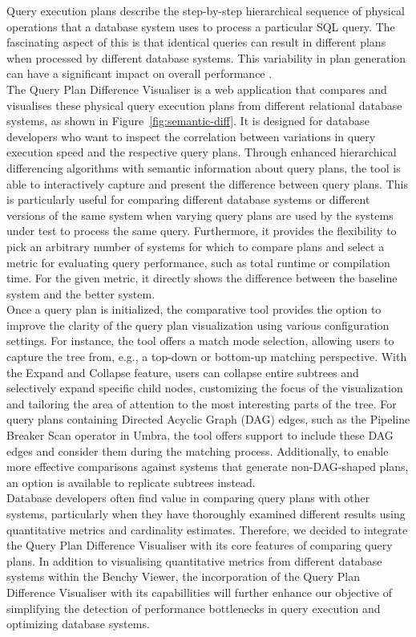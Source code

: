 Query execution plans describe the step-by-step hierarchical sequence of physical operations that a database system uses to process a particular SQL query. The fascinating aspect of this is that identical queries can result in different plans when processed by different database systems. This variability in plan generation can have a significant impact on overall performance \parencite*{GroupjoinAndNestedAggregates}.
\\The Query Plan Difference Visualiser is a web application that compares and visualises these physical query execution plans from different relational database systems, as shown in Figure~\ref{fig:semantic-diff}. It is designed for database developers who want to inspect the correlation between variations in query execution speed and the respective query plans. Through enhanced hierarchical differencing algorithms with semantic information about query plans, the tool is able to interactively capture and present  the difference between query plans. This is particularly useful for comparing different database systems or different versions of the same system when varying query plans are used by the systems under test to process the same query. Furthermore, it provides the flexibility to pick an arbitrary number of systems for which to compare plans and select a metric for evaluating query performance, such as total runtime or compilation time. For the given metric, it directly shows the difference between the baseline system and the better system.
\\ Once a query plan is initialized, the comparative tool provides the option to improve the clarity of the query plan visualization using various configuration settings. For instance, the tool offers a match mode selection, allowing users to capture the tree from, e.g., a top-down or bottom-up matching perspective. With the Expand and Collapse feature, users can collapse entire subtrees and selectively expand specific child nodes, customizing the focus of the visualization and tailoring the area of attention to the most interesting parts of the tree.
For query plans containing Directed Acyclic Graph (DAG) edges, such as the Pipeline Breaker Scan operator in Umbra, the tool offers support to include these DAG edges and consider them during the matching process. Additionally, to enable more effective comparisons against systems that generate non-DAG-shaped plans, an option is available to replicate subtrees instead.
\\ Database developers often find value in comparing query plans with other systems, particularly when they have thoroughly examined different results using quantitative metrics and cardinality estimates. 
Therefore, we decided to integrate the Query Plan Difference Visualiser with its core features of comparing query plans. In addition to visualising quantitative metrics from different database systems within the Benchy Viewer, the incorporation of the Query Plan Difference Visualiser with its capabillities will further enhance our objective of simplifying the detection of performance bottlenecks in query execution and optimizing database systems.

